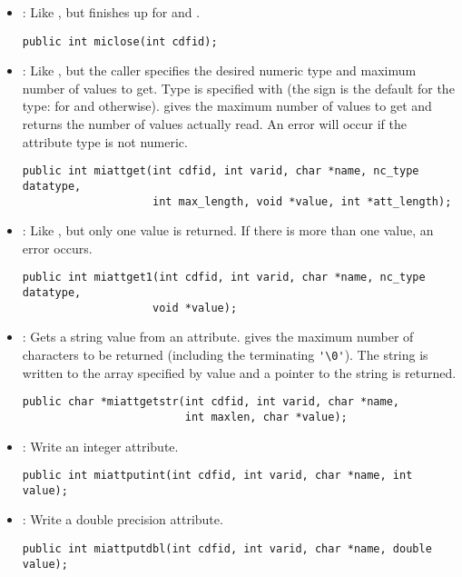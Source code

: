 \documentclass{article}
\begin{document}
\begin{itemize}
\item {} : Like , but finishes up for 
and .
\begin{verbatim}
public int miclose(int cdfid);
\end{verbatim}

\item {} : Like , but the caller specifies
the desired numeric type and maximum number of values to get. Type is
specified with  (the sign is the default for the type:
 for  and 
otherwise).  gives the maximum number of values to
get and  returns the number of values actually read.
An error will occur if the attribute type is not numeric.
\begin{verbatim}
public int miattget(int cdfid, int varid, char *name, nc_type datatype,
                    int max_length, void *value, int *att_length);
\end{verbatim}

\item {} : Like , but only one value is
returned. If there is more than one value, an error occurs.
\begin{verbatim}
public int miattget1(int cdfid, int varid, char *name, nc_type datatype,
                    void *value);
\end{verbatim}

\item {} : Gets a string value from an attribute.
   gives the maximum number of characters to be returned
  (including the terminating \verb+'\0'+). The string is written to
  the array specified by value and a pointer to the string is
  returned.
\begin{verbatim}
public char *miattgetstr(int cdfid, int varid, char *name, 
                         int maxlen, char *value);
\end{verbatim}

\item {} : Write an integer attribute.
\begin{verbatim}
public int miattputint(int cdfid, int varid, char *name, int value);
\end{verbatim}

\item {} : Write a double precision attribute.
\begin{verbatim}
public int miattputdbl(int cdfid, int varid, char *name, double value);
\end{verbatim}


\end{itemize}
\end{document}
